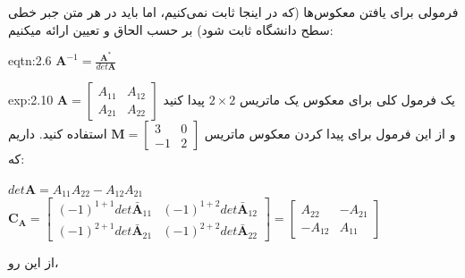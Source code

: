 {\begin{spacing}{1.5}
        فرمولی برای یافتن معکوس‌ها (که در اینجا ثابت نمی‌کنیم، اما باید در هر متن جبر خطی سطح دانشگاه ثابت شود) بر حسب الحاق و تعیین ارائه میکنیم:

        \begin{eqtn}{eqtn:2.6}
            \centering
            $\textbf{A}^{-1}=\frac{\displaystyle\textbf{A}^{*}}{\displaystyle det\textbf{A}}$
        \end{eqtn}

        \begin{example}{exp:2.10}
            \Large
            یک فرمول کلی برای معکوس یک ماتریس $2\times 2$ پیدا کنید $\textbf{A}=\begin{bmatrix}
                                                                                    A_{11} & A_{12} \\
                                                                                    A_{21} & A_{22}
            \end{bmatrix}$ و از این فرمول برای پیدا کردن معکوس ماتریس $\textbf{M}=\begin{bmatrix}
                                                                                      3  & 0 \\
                                                                                      -1 & 2
            \end{bmatrix}$ استفاده کنید.
            داریم که:

            \begin{center}
                $det \textbf{A}=A_{11}A_{22}-A_{12}A_{21}$ \textbf{\vspace{6pt}}
                $\textbf{C}_{\textbf{A}}=\begin{bmatrix}
                (-1)
                                             ^{1+1}det\bar{\textbf{A}}_{11}     & (-1)^{1+2}det\bar{\textbf{A}}_{12} \\
                                             (-1)^{2+1}det\bar{\textbf{A}}_{21} & (-1)^{2+2}det\bar{\textbf{A}}_{22}
                \end{bmatrix}=\begin{bmatrix}
                                  A_{22}  & -A_{21} \\
                                  -A_{12} & A_{11}
                \end{bmatrix}$
            \end{center}

            از این رو،


\end{example}
\end{spacing}}
